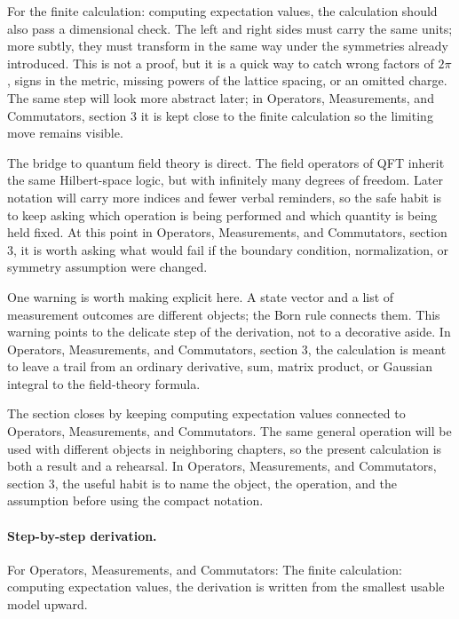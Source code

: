 For the finite calculation: computing expectation values, the calculation should also pass a dimensional check.  The left and right sides must carry the same units; more subtly, they must transform in the same way under the symmetries already introduced.  This is not a proof, but it is a quick way to catch wrong factors of \(2\pi\), signs in the metric, missing powers of the lattice spacing, or an omitted charge.  The same step will look more abstract later; in Operators, Measurements, and Commutators, section 3 it is kept close to the finite calculation so the limiting move remains visible.

The bridge to quantum field theory is direct.  The field operators of QFT inherit the same Hilbert-space logic, but with infinitely many degrees of freedom.  Later notation will carry more indices and fewer verbal reminders, so the safe habit is to keep asking which operation is being performed and which quantity is being held fixed.  At this point in Operators, Measurements, and Commutators, section 3, it is worth asking what would fail if the boundary condition, normalization, or symmetry assumption were changed.

One warning is worth making explicit here.  A state vector and a list of measurement outcomes are different objects; the Born rule connects them.  This warning points to the delicate step of the derivation, not to a decorative aside.  In Operators, Measurements, and Commutators, section 3, the calculation is meant to leave a trail from an ordinary derivative, sum, matrix product, or Gaussian integral to the field-theory formula.

The section closes by keeping computing expectation values connected to Operators, Measurements, and Commutators.  The same general operation will be used with different objects in neighboring chapters, so the present calculation is both a result and a rehearsal.  In Operators, Measurements, and Commutators, section 3, the useful habit is to name the object, the operation, and the assumption before using the compact notation.



\paragraph{Step-by-step derivation.}

For Operators, Measurements, and Commutators: The finite calculation: computing expectation values, the derivation is written from the smallest usable model upward.

